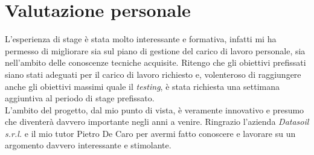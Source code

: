 \section{Valutazione personale}
L'esperienza di stage è stata molto interessante e formativa, infatti mi ha permesso di migliorare sia sul piano di gestione del carico di lavoro personale, sia nell'ambito delle conoscenze tecniche acquisite. Ritengo che gli obiettivi prefissati siano stati adeguati per il carico di lavoro richiesto e, volenteroso di raggiungere anche gli obiettivi massimi quale il \textit{testing}, è stata richiesta una settimana aggiuntiva al periodo di stage prefissato.\\
L'ambito del progetto, dal mio punto di vista, è veramente innovativo e presumo che diventerà davvero importante negli anni a venire. Ringrazio l'azienda \textit{Datasoil s.r.l.} e il mio tutor Pietro De Caro per avermi fatto conoscere e lavorare su un argomento davvero interessante e stimolante. 
